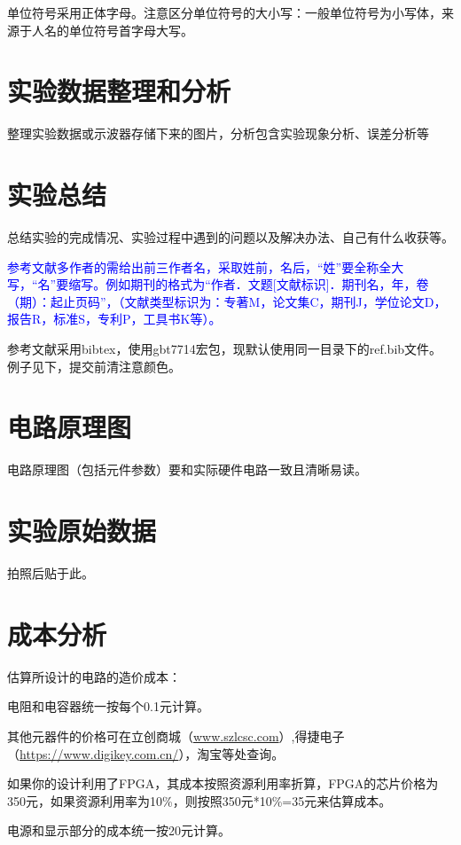 \documentclass[a4paper]{ctexart}
\begin{document}
\begin{multicols}{2}
    单位符号采用正体字母。注意区分单位符号的大小写：一般单位符号为小写体，来源于人名的单位符号首字母大写。

    \section{实验数据整理和分析}

    整理实验数据或示波器存储下来的图片，分析包含实验现象分析、误差分析等

    \section{实验总结}

    总结实验的完成情况、实验过程中遇到的问题以及解决办法、自己有什么收获等。

    \textcolor{blue}{参考文献多作者的需给出前三作者名，采取姓前，名后，“姓”要全称全大写，“名”要缩写。例如期刊的格式为“作者．文题[文献标识]．期刊名，年，卷（期）：起止页码”，（文献类型标识为：专著M，论文集C，期刊J，学位论文D，报告R，标准S，专利P，工具书K等）。}

    参考文献采用bibtex，使用gbt7714宏包，现默认使用同一目录下的ref.bib文件。例子见下，提交前清注意颜色。

    \nocite{example1,example2,example3,example4,example5,example6,example7}

    \textcolor{blue}{\small{
            
            
        }}

\end{multicols}

\newpage

\appendix

\section{电路原理图}

电路原理图（包括元件参数）要和实际硬件电路一致且清晰易读。

\section{实验原始数据}

拍照后贴于此。

\section{成本分析}

估算所设计的电路的造价成本：

电阻和电容器统一按每个0.1元计算。

其他元器件的价格可在立创商城（\url{www.szlcsc.com}）,得捷电子（\url{https://www.digikey.com.cn/}），淘宝等处查询。

如果你的设计利用了FPGA，其成本按照资源利用率折算，FPGA的芯片价格为350元，如果资源利用率为10\%，则按照350元*10\%=35元来估算成本。

电源和显示部分的成本统一按20元计算。
\end{document}
